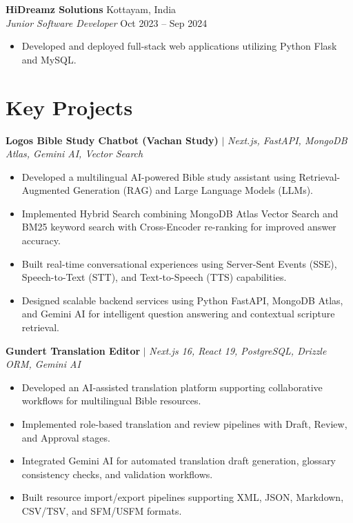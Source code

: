 \documentclass[10pt, letterpaper]{article}
\begin{document}
\textbf{HiDreamz Solutions} \hfill Kottayam, India \\
\textit{Junior Software Developer} \hfill Oct 2023 -- Sep 2024
\begin{itemize}[leftmargin=0.25in, itemsep=0pt, parsep=0pt, topsep=2pt]
    \item Developed and deployed full-stack web applications utilizing Python Flask and MySQL.
\end{itemize}

\section*{Key Projects}
\textbf{Logos Bible Study Chatbot (Vachan Study)} $|$ \textit{Next.js, FastAPI, MongoDB Atlas, Gemini AI, Vector Search}
\begin{itemize}[leftmargin=0.25in, itemsep=0pt, parsep=0pt, topsep=2pt]
    \item Developed a multilingual AI-powered Bible study assistant using Retrieval-Augmented Generation (RAG) and Large Language Models (LLMs).
    \item Implemented Hybrid Search combining MongoDB Atlas Vector Search and BM25 keyword search with Cross-Encoder re-ranking for improved answer accuracy.
    \item Built real-time conversational experiences using Server-Sent Events (SSE), Speech-to-Text (STT), and Text-to-Speech (TTS) capabilities.
    \item Designed scalable backend services using Python FastAPI, MongoDB Atlas, and Gemini AI for intelligent question answering and contextual scripture retrieval.
\end{itemize}
\textbf{Gundert Translation Editor} $|$ \textit{Next.js 16, React 19, PostgreSQL, Drizzle ORM, Gemini AI}
\begin{itemize}[leftmargin=0.25in, itemsep=0pt, parsep=0pt, topsep=2pt]
    \item Developed an AI-assisted translation platform supporting collaborative workflows for multilingual Bible resources.
    \item Implemented role-based translation and review pipelines with Draft, Review, and Approval stages.
    \item Integrated Gemini AI for automated translation draft generation, glossary consistency checks, and validation workflows.
    \item Built resource import/export pipelines supporting XML, JSON, Markdown, CSV/TSV, and SFM/USFM formats.
\end{itemize}
\end{document}
